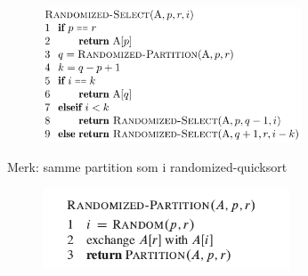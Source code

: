 \documentclass[12pt]{report}
\begin{document}
\vspace{\baselineskip}
\begin{multicols}{2}



\begin{figure}[H]
	\begin{Center}
		\includegraphics[width=3.02in,height=1.58in]{./media/image42.png}
	\end{Center}
\end{figure}



\par

{\fontsize{13pt}{15.6pt}\selectfont \textcolor[HTML]{353535}{Merk: samme partition som i randomized-quicksort}\par}\par




\begin{figure}[H]
	\begin{Center}
		\includegraphics[width=2.9in,height=0.94in]{./media/image29.png}
	\end{Center}
\end{figure}



\par


\vspace{\baselineskip}

\end{multicols}
\end{document}
